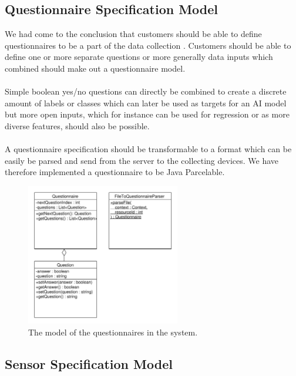 \subsection{Questionnaire Specification Model}
\label{sub:questionnaire_model}
We had come to the conclusion that customers should be able to define questionnaires to be a part of the data collection . Customers should be able to define one or more separate questions or more generally data inputs which combined should make out a questionnaire model. 
\\\\
Simple boolean yes/no questions can directly be combined to create a discrete amount of labels or classes which can later be used as targets for an AI model but more open inputs, which for instance can be used for regression or as more diverse features, should also be possible. 
\\\\
A questionnaire specification should be transformable to a format which can be easily be parsed and send from the server to the collecting devices. We have therefore implemented a questionnaire to be Java Parcelable. 

\begin{figure}[!htbp]
	\centering
	\includegraphics[width=0.6\textwidth]{graphic/data_modeling/questionnaire.pdf}
	\caption{The model of the questionnaires in the system.}
	\label{fig:questionnaire_model}
\end{figure}
\FloatBarrier

\subsection{Sensor Specification Model}
\label{sub:sensor_specification_model}

